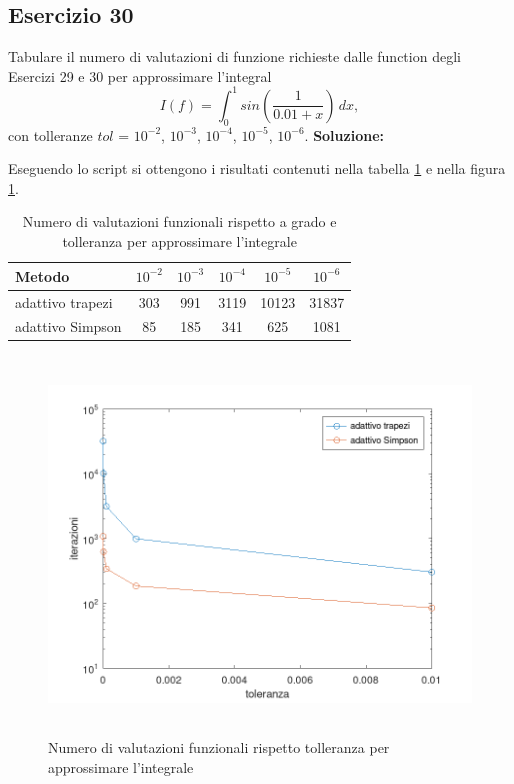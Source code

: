 \subsection{Esercizio 30}
Tabulare il numero di valutazioni di funzione richieste dalle function
degli Esercizi 29 e 30 per approssimare l'integral
\[
    I(f) = \int_{0}^{1} sin\left(\frac{1}{0.01+x}\right)\,dx,
\]
con tolleranze $tol$ = $10^{-2}$, $10^{-3}$, $10^{-4}$, $10^{-5}$, $10^{-6}$.
\newline \textbf{Soluzione:}

Eseguendo lo script  si ottengono i risultati contenuti nella
tabella \ref{tab:30} e nella figura \ref{fig:es30}.
\begin{table}[ht]
    \centering
    \renewcommand\arraystretch{2}
    \begin{tabular}{| l | c c c c c |}
        \hline
        Metodo           & $10^{-2}$ & $10^{-3}$ & $10^{-4}$ & $10^{-5}$ & $10^{-6}$ \\
        \hline
        adattivo trapezi & 303       & 991       & 3119      & 10123     & 31837     \\
        adattivo Simpson & 85        & 185       & 341       & 625       & 1081      \\
        \hline
    \end{tabular}
    \caption{Numero di valutazioni funzionali rispetto a grado e tolleranza per approssimare l'integrale}
    \label{tab:30}
\end{table}
\FloatBarrier
\begin{figure}[!ht]
    \centering
    \includegraphics[width=16cm,height=10cm,keepaspectratio]{capitolo5/es30_figure.png}
    \caption{Numero di valutazioni funzionali rispetto tolleranza per approssimare l'integrale}
    \label{fig:es30}
\end{figure}
\FloatBarrier
